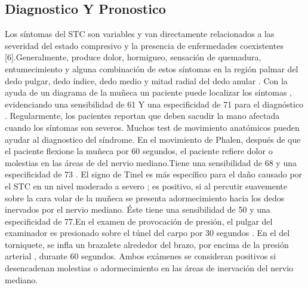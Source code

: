 \documentclass[a4paper,man,natbib]{apa6}
\begin{document}
\subsection{Diagnostico Y Pronostico}

Los síntomas del STC son variables y van directamente relacionados a las severidad del estado compresivo y la presencia de  enfermedades coexistentes [6].Generalmente, produce dolor, hormigueo, sensación de quemadura, entumecimiento y alguna combinación de estos  síntomas en la región palmar del dedo pulgar, dedo índice, dedo medio y mitad radial del dedo anular \cite{o7}\cite{o8}\cite{o9}. Con la ayuda de un diagrama de la  muñeca un paciente puede localizar los síntomas , evidenciando una sensibilidad de 61 Y una especificidad de 71 para el diagnóstico \cite{o11}. Regularmente, los pacientes reportan que deben sacudir la mano afectada cuando los síntomas son severos. Muchos test de movimiento anatómicos pueden ayudar al diagnostico del síndrome. En el movimiento de Phalen, después de que el paciente flexione la muñeca por 60 segundos, el paciente refiere dolor o molestias en las áreas de  del nervio mediano\cite{o12}.Tiene una sensibilidad de 68 y una especificidad de 73 \cite{o13}. El signo de Tinel es más específico para el daño causado  por el STC en un nivel moderado a severo \cite{o14}\cite{o15}; es positivo, si al percutir suavemente sobre la cara volar de la muñeca se presenta  adormecimiento  hacia los dedos inervados por el nervio mediano. Éste tiene una sensibilidad de 50 y una especificidad de 77.En el examen de  provocación de presión, el pulgar del examinador es presionado sobre el túnel del carpo por 30 segundos \cite{o16}. En el del torniquete, se infla un  brazalete alrededor del brazo, por encima de la presión arterial , durante 60 segundos. Ambos exámenes se consideran positivos si desencadenan  molestias o adormecimiento en las áreas de inervación del nervio mediano.
\end{document}
